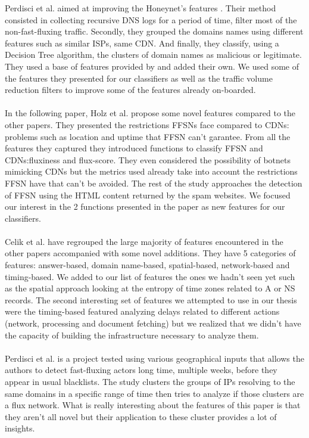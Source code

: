 Perdisci et al. \cite{ff2} aimed at improving the Honeynet's features \cite{honeynet}. Their method consisted in collecting recursive DNS logs for a period of time, filter most of the non-fast-fluxing traffic. Secondly, they grouped the domains names using different features such as similar ISPs, same CDN. And finally, they classify, using a Decision Tree algorithm, the clusters of domain names as malicious or legitimate. They used a base of features provided by \cite{fluXOR} and added their own. We used some of the features they presented for our classifiers as well as the traffic volume reduction filters to improve some of the features already on-boarded. \\
\\
In the following paper, Holz et al. \cite{ff3} propose some novel features compared to the other papers. They presented the restrictions FFSNs face compared to CDNs: problems such as location and uptime that FFSN can't garantee. From all the features they captured they introduced functions to classify FFSN and CDNs:fluxiness and flux-score. They even considered the possibility of botnets mimicking CDNs but the metrics used already take into account the restrictions FFSN have that can't be avoided. The rest of the study approaches the detection of FFSN using the HTML content returned by the spam websites. We focused our interest in the 2 functions presented in the paper as new features for our classifiers.\\
\\
Celik et al. \cite{ff4} have regrouped the large majority of features encountered in the other papers accompanied with some novel additions. They have 5 categories of features: answer-based, domain name-based, spatial-based, network-based and timing-based. We added to our list of features the ones we hadn't seen yet such as the spatial approach looking at the entropy of time zones related to A or NS records. The second interesting set of features we attempted to use in our thesis were the timing-based featured analyzing delays related to different actions (network, processing and document fetching) but we realized that we didn't have the capacity of building the infrastructure necessary to analyze them.\\
\\
Perdisci et al. \cite{ff} is a project tested using various geographical inputs that allows the authors to detect fast-fluxing actors long time, multiple weeks, before they appear in usual blacklists. The study clusters the groups of IPs resolving to the same domains in a specific range of time then tries to analyze if those clusters are a flux network. What is really interesting about the features of this paper is that they aren't all novel but their application to these cluster provides a lot of insights.

